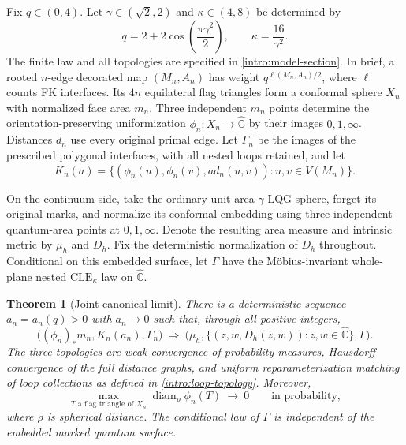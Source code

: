 \documentclass[11pt]{article}
\numberwithin{equation}{section}
\newtheorem{theorem}{Theorem}[section]
\theoremstyle{definition}
\theoremstyle{remark}
\newcommand{\1}{\mathbf 1}
\begin{document}
Fix $q\in(0,4)$. Let $\gamma\in(\sqrt2,2)$ and $\kappa\in(4,8)$ be
determined by
\begin{equation}\label{intro:parameters}
 q=2+2\cos\!\left(\frac{\pi\gamma^2}{2}\right),
 \qquad \kappa=\frac{16}{\gamma^2}.
\end{equation}
The finite law and all topologies are specified in
\cref{intro:model-section}. In brief, a rooted $n$-edge decorated map
$(M_n,A_n)$ has weight $q^{\ell(M_n,A_n)/2}$, where $\ell$ counts FK
interfaces. Its $4n$ equilateral flag triangles form a conformal sphere
$X_n$ with normalized face area $m_n$. Three independent $m_n$ points
determine the orientation-preserving uniformization
$\phi_n:X_n\to\widehat{\mathbb C}$ by their images $0,1,\infty$.
Distances $d_n$ use every original primal edge. Let $\Gamma_n$ be the
images of the prescribed polygonal interfaces, with all nested loops
retained, and let
\begin{equation}\label{intro:distance-graph}
 K_n(a)=\{(\phi_n(u),\phi_n(v),a d_n(u,v)):u,v\in V(M_n)\}.
\end{equation}

On the continuum side, take the ordinary unit-area $\gamma$-LQG sphere,
forget its original marks, and normalize its conformal embedding using
three independent quantum-area points at $0,1,\infty$. Denote the
resulting area measure and intrinsic metric by $\mu_h$ and $D_h$.
Fix the deterministic normalization of $D_h$ throughout. Conditional on
this embedded surface, let $\Gamma$ have the M\"obius-invariant whole-plane
nested $\mathrm{CLE}_{\kappa}$ law on $\widehat{\mathbb C}$.

\begin{theorem}[Joint canonical limit]\label{intro:main}
There is a deterministic sequence
$a_n=a_n(q)>0$ with $a_n\to0$ such that, through all positive integers,
\begin{equation}\label{intro:joint-convergence}
 \big((\phi_n)_*m_n,K_n(a_n),\Gamma_n\big)
 \ \Longrightarrow\
 \big(\mu_h,\{(z,w,D_h(z,w)):z,w\in\widehat{\mathbb C}\},\Gamma\big).
\end{equation}
The three topologies are weak convergence of probability measures,
Hausdorff convergence of the full distance graphs, and uniform
reparameterization matching of loop collections as defined in
\cref{intro:loop-topology}. Moreover,
\begin{equation}\label{intro:mesh-conclusion}
 \max_{T\text{ a flag triangle of }X_n}
       \operatorname{diam}_{\rho}\phi_n(T)\ \longrightarrow\ 0
 \qquad\text{in probability},
\end{equation}
where $\rho$ is spherical distance. The conditional law of $\Gamma$ is
independent of the embedded marked quantum surface.
\end{theorem}
\end{document}
